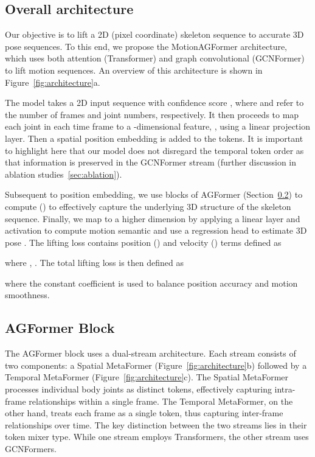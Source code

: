 \documentclass[10pt,twocolumn,letterpaper]{article}
\begin{document}
\subsection{Overall architecture} \label{sec:overall-architecture}
    Our objective is to lift a 2D (pixel coordinate) skeleton sequence  to accurate 3D pose sequences. To this end, we propose the MotionAGFormer architecture, which uses both attention (Transformer) and graph convolutional (GCNFormer) to lift motion sequences. 
    An overview of this architecture is shown in Figure~\ref{fig:architecture}a. 
    
    The model takes a 2D input sequence with confidence score \mbox{}, where  and  refer to the number of frames and joint numbers, respectively. It then proceeds to map each joint in each time frame to a -dimensional feature, , using a linear projection layer. Then a spatial position embedding  is added to the tokens. It is important to highlight here that our model does not disregard the temporal token order as that information is preserved in the GCNFormer stream (further discussion in ablation studies~\ref{sec:ablation}). 
     
     Subsequent to position embedding, we use  blocks of AGFormer (Section~\ref{sec:AGFormer}) to compute  () to effectively capture the underlying 3D structure of the skeleton sequence. Finally, we map  to a higher dimension by applying a linear layer and  activation to compute motion semantic  and use a regression head to estimate 3D pose . The lifting loss contains position () and velocity () terms defined as
    
    
    where , . The total lifting loss is then defined as
    
    where the constant coefficient  is used to balance position accuracy and motion smoothness.
    




\subsection{AGFormer Block}
    \label{sec:AGFormer}
    The AGFormer block uses a dual-stream architecture. Each stream consists of two components: a Spatial MetaFormer (Figure~\ref{fig:architecture}b) followed by a Temporal MetaFormer (Figure~\ref{fig:architecture}c). The Spatial MetaFormer processes individual body joints as distinct tokens, effectively capturing intra-frame relationships within a single frame. The Temporal MetaFormer, on the other hand, treats each frame as a single token, thus capturing inter-frame relationships over time. The key distinction between the two streams lies in their token mixer type. While one stream employs Transformers, the other stream uses GCNFormers.
    
\end{document}
